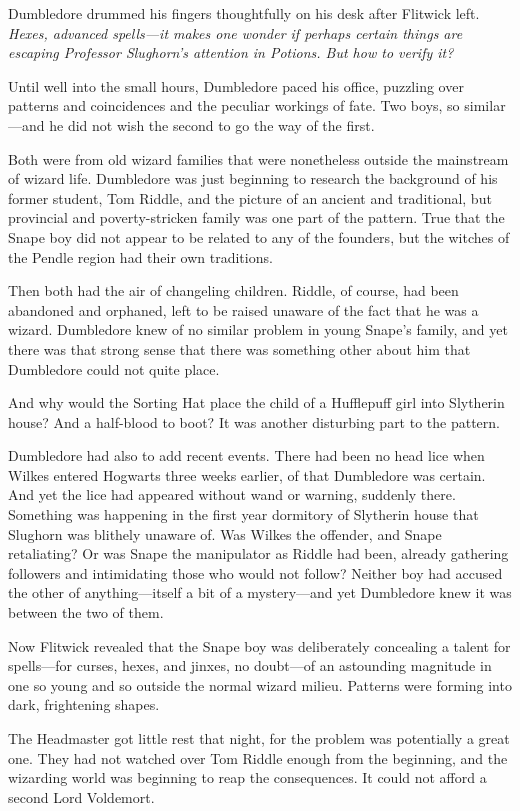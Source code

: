 Dumbledore drummed his fingers thoughtfully on his desk after Flitwick left. \emph{Hexes, advanced spells—it makes one wonder if perhaps certain things are escaping Professor Slughorn's attention in Potions. But how to verify it?}

Until well into the small hours, Dumbledore paced his office, puzzling over patterns and coincidences and the peculiar workings of fate. Two boys, so similar—and he did not wish the second to go the way of the first.

Both were from old wizard families that were nonetheless outside the mainstream of wizard life. Dumbledore was just beginning to research the background of his former student, Tom Riddle, and the picture of an ancient and traditional, but provincial and poverty-stricken family was one part of the pattern. True that the Snape boy did not appear to be related to any of the founders, but the witches of the Pendle region had their own traditions.

Then both had the air of changeling children. Riddle, of course, had been abandoned and orphaned, left to be raised unaware of the fact that he was a wizard. Dumbledore knew of no similar problem in young Snape's family, and yet there was that strong sense that there was something other about him that Dumbledore could not quite place.

And why would the Sorting Hat place the child of a Hufflepuff girl into Slytherin house? And a half-blood to boot? It was another disturbing part to the pattern.

Dumbledore had also to add recent events. There had been no head lice when Wilkes entered Hogwarts three weeks earlier, of that Dumbledore was certain. And yet the lice had appeared without wand or warning, suddenly there. Something was happening in the first year dormitory of Slytherin house that Slughorn was blithely unaware of. Was Wilkes the offender, and Snape retaliating? Or was Snape the manipulator as Riddle had been, already gathering followers and intimidating those who would not follow? Neither boy had accused the other of anything—itself a bit of a mystery—and yet Dumbledore knew it was between the two of them.

Now Flitwick revealed that the Snape boy was deliberately concealing a talent for spells—for curses, hexes, and jinxes, no doubt—of an astounding magnitude in one so young and so outside the normal wizard milieu. Patterns were forming into dark, frightening shapes.

The Headmaster got little rest that night, for the problem was potentially a great one. They had not watched over Tom Riddle enough from the beginning, and the wizarding world was beginning to reap the consequences. It could not afford a second Lord Voldemort.

